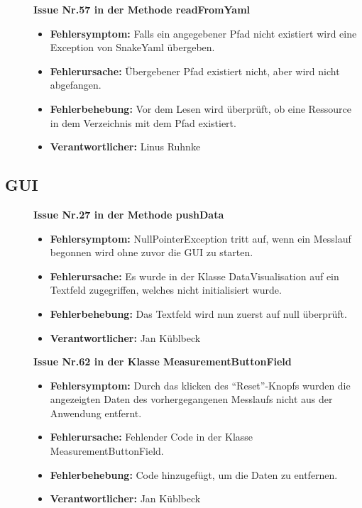 \documentclass[parskip=full]{scrartcl}
\begin{document}
\begin{description}
\item []\textbf{Issue Nr.57 in der Methode readFromYaml} 

\begin{itemize}
\item []\textbf{Fehlersymptom:} Falls ein angegebener Pfad nicht existiert wird eine Exception von SnakeYaml übergeben.
\item []\textbf{Fehlerursache:} Übergebener Pfad existiert nicht, aber wird nicht abgefangen.
\item []\textbf{Fehlerbehebung:} Vor dem Lesen wird überprüft, ob eine Ressource in dem Verzeichnis mit dem Pfad existiert.
\item []\textbf{Verantwortlicher:} Linus Ruhnke
\end{itemize}

\end{description}


\clearpage
\subsection{GUI}

\begin{description}

\item []\textbf{Issue Nr.27 in der Methode pushData} 

\begin{itemize}
\item []\textbf{Fehlersymptom:} NullPointerException tritt auf, wenn ein Messlauf begonnen wird ohne zuvor die GUI zu starten.
\item []\textbf{Fehlerursache:} Es wurde in der Klasse DataVisualisation auf ein Textfeld zugegriffen, welches nicht initialisiert wurde.
\item []\textbf{Fehlerbehebung:} Das Textfeld wird nun zuerst auf null überprüft.
\item []\textbf{Verantwortlicher:} Jan Küblbeck
\end{itemize}

\item []\textbf{Issue Nr.62 in der Klasse MeasurementButtonField} 

\begin{itemize}
\item []\textbf{Fehlersymptom:} Durch das klicken des ``Reset''-Knopfs wurden die angezeigten Daten des vorhergegangenen Messlaufs nicht aus der Anwendung entfernt.
\item []\textbf{Fehlerursache:} Fehlender Code in der Klasse MeasurementButtonField.
\item []\textbf{Fehlerbehebung:} Code hinzugefügt, um die Daten zu entfernen.
\item []\textbf{Verantwortlicher:} Jan Küblbeck
\end{itemize}

\end{description}
\end{document}
